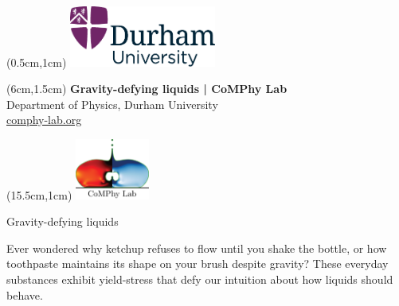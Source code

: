 \documentclass[11pt]{article}
\newlength{\headertobodysep}
\begin{document}
\thispagestyle{empty}

\textblockorigin{0pt}{0pt}

\begin{textblock*}{5cm}(0.5cm,1cm)
    \includegraphics[height=2cm]{../_logosAndRef/Durham-University.pdf}
\end{textblock*}

\begin{textblock*}{9cm}(6cm,1.5cm)
    \centering
    {\large \textbf{Gravity-defying liquids | CoMPhy Lab}}\\[0.2em]
    Department of Physics, Durham University\\[0.3em]
    \href{https://comphy-lab.org}{comphy-lab.org}
\end{textblock*}

\begin{textblock*}{5cm}(15.5cm,1cm) %
    \includegraphics[height=2cm]{../_logosAndRef/CoMPhy-Lab.png}
\end{textblock*}

\vspace*{\headertobodysep}

\begin{center}
    \begin{LARGE}
     Gravity-defying liquids
    \end{LARGE}
\end{center}

\noindent Ever wondered why ketchup refuses to flow until you shake the bottle, or how toothpaste maintains its shape on your brush despite gravity? These everyday substances exhibit yield-stress that defy our intuition about how liquids should behave.
\end{document}
